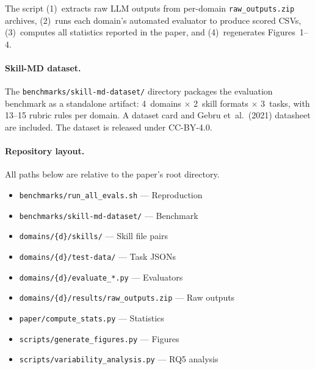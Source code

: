 \documentclass[sigconf,nonacm]{acmart}
\begin{document}
\noindent The script (1)~extracts raw LLM outputs from per-domain
\texttt{raw\_outputs.zip} archives, (2)~runs each domain's automated
evaluator to produce scored CSVs, (3)~computes all statistics reported
in the paper, and (4)~regenerates Figures~1--4.

\paragraph{Skill-MD dataset.}
The \texttt{benchmarks/skill-md-dataset/} directory packages the
evaluation benchmark as a standalone artifact: 4~domains $\times$
2~skill formats $\times$ 3~tasks, with 13--15 rubric rules per domain.
A dataset card and Gebru et~al.\ (2021) datasheet are included.
The dataset is released under CC-BY-4.0.

\paragraph{Repository layout.}
All paths below are relative to the paper's root directory.

{\small
\begin{itemize}\setlength{\itemsep}{1pt}
  \item \texttt{benchmarks/run\_all\_evals.sh} --- Reproduction
  \item \texttt{benchmarks/skill-md-dataset/} --- Benchmark
  \item \texttt{domains/\{d\}/skills/} --- Skill file pairs
  \item \texttt{domains/\{d\}/test-data/} --- Task JSONs
  \item \texttt{domains/\{d\}/evaluate\_*.py} --- Evaluators
  \item \texttt{domains/\{d\}/results/raw\_outputs.zip} --- Raw outputs
  \item \texttt{paper/compute\_stats.py} --- Statistics
  \item \texttt{scripts/generate\_figures.py} --- Figures
  \item \texttt{scripts/variability\_analysis.py} --- RQ5 analysis
\end{itemize}
}
\end{document}

